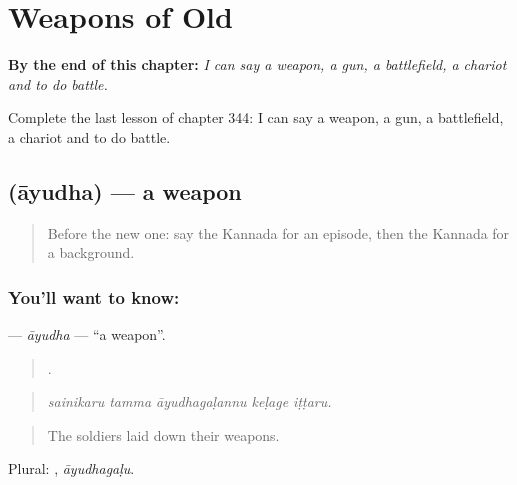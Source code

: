 
\chapter{Weapons of Old}
\label{ch:ka-weapons-of-old}

\begin{chapteropening}
\textbf{By the end of this chapter:} \emph{I can say a weapon, a gun, a battlefield, a chariot and to do battle.}

Complete the last lesson of chapter 344: I can say a weapon, a gun, a battlefield, a chariot and to do battle.
\end{chapteropening}

\section[\texorpdfstring{\kn{ಆಯುಧ} (āyudha)}{ಆಯುಧ (āyudha)}]{ (āyudha) — a weapon}

\label{lesson:KA-C344-ayudha}



\begin{quote}
Before the new one: say the Kannada for an episode, then the Kannada for a background.
\end{quote}

\subsection*{You'll want to know: }
\textbf{} — \emph{āyudha} — \textquotedblleft{}a weapon\textquotedblright{}.

\begin{quote}
    .
\end{quote}

\begin{quote}
\emph{sainikaru tamma āyudhagaḷannu keḷage iṭṭaru.}
\end{quote}

\begin{quote}
The soldiers laid down their weapons.
\end{quote}

Plural: , \emph{āyudhagaḷu}.

